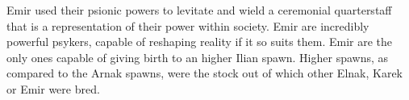 Emir used their psionic powers to levitate and wield a ceremonial
quarterstaff that is a representation of their power within society. Emir are
incredibly powerful psykers, capable of reshaping reality if it so suits
them. Emir are the only ones capable of giving birth to an higher Ilian
spawn. Higher spawns, as compared to the Arnak spawns, were the stock out of
which other Elnak, Karek or Emir were bred.
